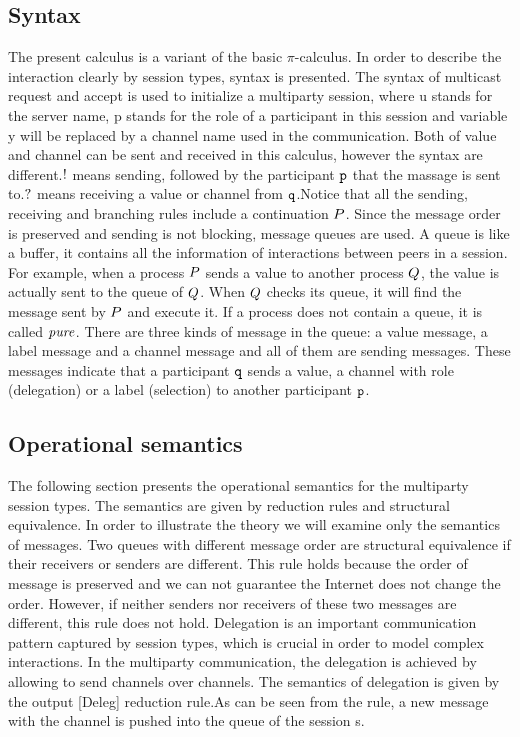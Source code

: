\documentclass[a4paper]{article}
\begin{document}
\subsection{Syntax}
The present calculus is a variant of the basic \(\pi\)-calculus. In order to describe the interaction clearly by session types, syntax is presented. The syntax of multicast request and accept is used to initialize a multiparty session, where u stands for the server name, p stands for the role of a participant in this session and variable y will be replaced by a channel name used in the communication. Both of value and channel can be sent and received in this calculus, however the syntax are different.$\ensuremath !$ means sending, followed by the participant $\mathtt{p}$ that the massage is sent to.$\ensuremath ?$ means receiving a value or channel from $\mathtt{q}$.Notice that all the sending, receiving and branching rules include a continuation $P$. Since the message order is preserved and sending is not blocking, message queues are used. A queue is like a buffer, it contains all the information of interactions between peers in a session. For example, when a process $P$ sends a value to another process $Q$, the value is actually sent to the queue of $Q$. When $Q$ checks its queue, it will find the message sent by $P$ and execute it. If a process does not contain a queue, it is called $\it pure$.
There are three kinds of message in the queue: a value message, a label message and a channel message and all of them are sending messages. These messages indicate that a participant $\mathtt{q}$ sends a value, a channel with role (delegation) or a label (selection) to another participant $\mathtt{p}$.
\subsection{Operational semantics}
The following section presents the operational semantics for the multiparty session types. The semantics are given by reduction rules and structural equivalence. In order to illustrate the theory we will examine only the semantics of messages.
Two queues with different message order are structural equivalence if their receivers or senders are different. This rule holds because the order of message is preserved and we can not guarantee the Internet does not change the order. However, if neither senders nor receivers of these two messages are different,  this rule does not hold. Delegation is an important communication pattern captured by session types, which is crucial in order to model complex interactions. In the multiparty communication, the delegation is achieved by allowing to send channels over channels. The semantics of delegation is given by the output [Deleg] reduction rule.As can be seen from the rule, a new message with the channel is pushed into the queue of the session s.
\end{document}
